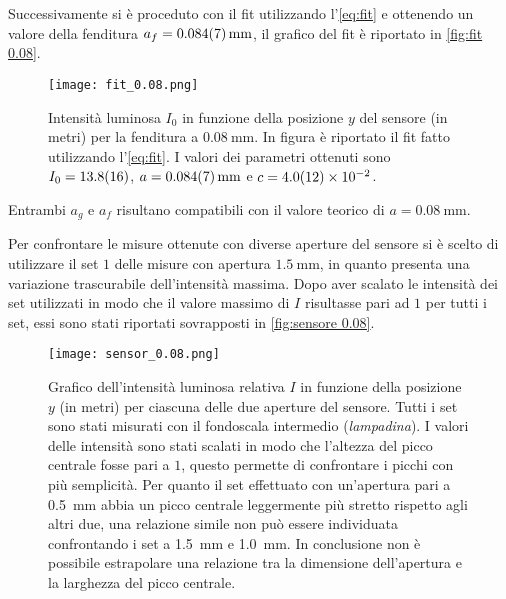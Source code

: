 \documentclass[../main.tex]{subfiles}
\begin{document}
Successivamente si è proceduto con il fit utilizzando l'\autoref{eq:fit} e ottenendo un valore della fenditura $a_f = \qty{0.084+-0.007}{\mm}$, il grafico del fit è riportato in \autoref{fig:fit 0.08}.

\begin{figure}[ht!]
    \centering
    \texttt{[image: fit\_0.08.png]}
    \caption{Intensità luminosa $I_{0}$ in funzione della posizione $y$ del sensore (in metri) per la fenditura a $\qty{0.08}{\mm}$. In figura è riportato il fit fatto utilizzando l'\autoref{eq:fit}. I valori dei parametri ottenuti sono $I_{0} = \num{13.8+-1.6}$, $a = \qty{0.084+-0.007}{\mm}$ e $c = \num{4+-1.2e-2}$.}
    \label{fig:fit 0.08}
\end{figure}

Entrambi $a_g$ e $a_f$ risultano compatibili con il valore teorico di $a = \qty{0.08}{\mm}$.

Per confrontare le misure ottenute con diverse aperture del sensore si è scelto di utilizzare il set $1$ delle misure con apertura $\qty{1.5}{\mm}$, in quanto presenta una variazione trascurabile dell'intensità massima. %
Dopo aver scalato le intensità dei set utilizzati in modo che il valore massimo di $I$ risultasse pari ad $1$ per tutti i set, essi sono stati riportati sovrapposti in \autoref{fig:sensore 0.08}.

\begin{figure}[ht!]
    \centering
    \texttt{[image: sensor\_0.08.png]}
    \caption{Grafico dell'intensità luminosa relativa $I$ in funzione della posizione $y$ (in metri) per ciascuna delle due aperture del sensore.
Tutti i set sono stati misurati con il fondoscala intermedio (\textit{lampadina}). I valori delle intensità sono stati scalati in modo che l'altezza del picco centrale fosse pari a $1$, questo permette di confrontare i picchi con più semplicità.
Per quanto il set effettuato con un'apertura pari a \qty{0.5}{\mm} abbia un picco centrale leggermente più stretto rispetto agli altri due, una relazione simile non può essere individuata confrontando i set a \qty{1.5}{\mm} e \qty{1.0}{\mm}. In conclusione non è possibile estrapolare una relazione tra la dimensione dell'apertura e la larghezza del picco centrale.}
    \label{fig:sensore 0.08}
\end{figure}
\end{document}
